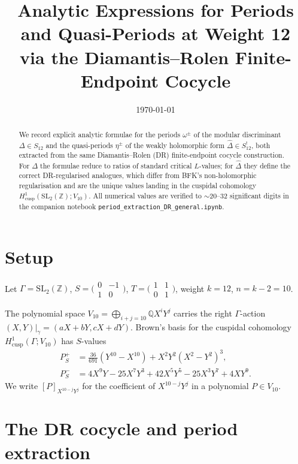 \documentclass[11pt,letterpaper]{article}
\title{Analytic Expressions for Periods and Quasi-Periods at Weight 12\\[0.3em]
       via the Diamantis--Rolen Finite-Endpoint Cocycle}
\author{}
\date{\today}
\newcommand{\ZZ}{\mathbb{Z}}
\newcommand{\QQ}{\mathbb{Q}}
\newcommand{\SLZ}{\mathrm{SL}_2(\ZZ)}
\newcommand{\Dhat}{\widehat{\Delta}}
\begin{document}
\maketitle

\begin{abstract}
We record explicit analytic formulae for the periods $\omega^\pm$ of the modular
discriminant $\Delta \in S_{12}$ and the quasi-periods $\eta^\pm$ of the weakly
holomorphic form $\Dhat \in S_{12}^!$, both extracted from the same
Diamantis--Rolen (DR) finite-endpoint cocycle construction.  For $\Delta$ the
formulae reduce to ratios of standard critical $L$-values; for $\Dhat$ they
define the correct DR-regularised analogues, which differ from BFK's
non-holomorphic regularisation and are the unique values landing in the cuspidal
cohomology $H^1_{\mathrm{cusp}}(\SLZ; V_{10})$.  All numerical values are
verified to $\sim 20$--$32$ significant digits in the companion notebook
\texttt{period\_extraction\_DR\_general.ipynb}.
\end{abstract}

\section{Setup}

Let $\Gamma = \SLZ$, $S = \bigl(\begin{smallmatrix}0&-1\\1&0\end{smallmatrix}\bigr)$,
$T = \bigl(\begin{smallmatrix}1&1\\0&1\end{smallmatrix}\bigr)$, weight $k = 12$, $n = k-2 = 10$.

The polynomial space $V_{10} = \bigoplus_{i+j=10}\QQ X^i Y^j$ carries the right
$\Gamma$-action $(X,Y)\big|_\gamma = (aX+bY, cX+dY)$.  Brown's basis
\cite{Brown2017} for the cuspidal cohomology $H^1_{\mathrm{cusp}}(\Gamma; V_{10})$
has $S$-values
\begin{align}
  P^+_S &= \tfrac{36}{691}(Y^{10}-X^{10}) + X^2 Y^2(X^2-Y^2)^3, \\
  P^-_S &= 4X^9 Y - 25 X^7 Y^3 + 42 X^5 Y^5 - 25 X^3 Y^7 + 4 X Y^9.
\end{align}
We write $[P]_{X^{10-j}Y^j}$ for the coefficient of $X^{10-j}Y^j$ in a polynomial
$P \in V_{10}$.

\section{The DR cocycle and period extraction}
\end{document}
